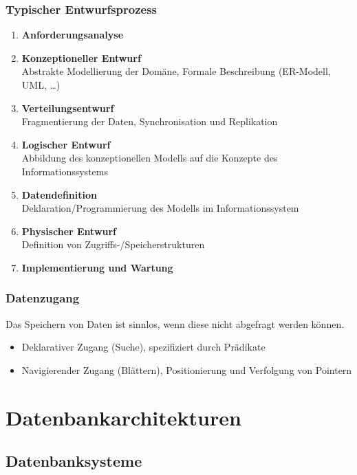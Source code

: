 		\subsection{Typischer Entwurfsprozess} %
			\begin{enumerate}
				\item \textbf{Anforderungsanalyse}
				\item \textbf{Konzeptioneller Entwurf} \\ Abstrakte Modellierung der Domäne, Formale Beschreibung (ER-Modell, UML, \dots)
				\item \textbf{Verteilungsentwurf} \\ Fragmentierung der Daten, Synchronisation und Replikation
				\item \textbf{Logischer Entwurf} \\ Abbildung des konzeptionellen Modells auf die Konzepte des Informationssystems
				\item \textbf{Datendefinition} \\ Deklaration/Programmierung des Modells im Informationssystem
				\item \textbf{Physischer Entwurf} \\ Definition von Zugriffs-/Speicherstrukturen
				\item \textbf{Implementierung und Wartung}
			\end{enumerate}

		\subsection{Datenzugang} %
			Das Speichern von Daten ist sinnlos, wenn diese nicht abgefragt werden können.

			\begin{itemize}
				\item Deklarativer Zugang (Suche), spezifiziert durch Prädikate
				\item Navigierender Zugang (Blättern), Positionierung und Verfolgung von Pointern
			\end{itemize}

\chapter{Datenbankarchitekturen} %
	\label{c:dbarchs}

	\section{Datenbanksysteme} %
